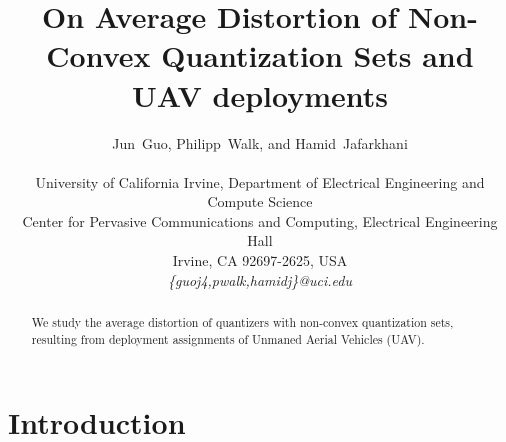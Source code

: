 \documentclass[smallabstract,smallcaptions]{dccpaper}
\begin{document}
%
\title{On Average Distortion of Non-Convex Quantization Sets and UAV deployments}


\newtheorem{corollary}{Corollary}

\author{Jun~Guo, Philipp~Walk, and Hamid~Jafarkhani\\
  {\small\hspace{-0.5cm}\begin{minipage}{\textwidth}
\begin{tabular}{c}
University of California Irvine, Department of Electrical Engineering and Compute Science\\
Center for Pervasive Communications and Computing, Electrical Engineering Hall  \\
Irvine, CA 92697-2625, USA \\
{\it\{guoj4,pwalk,hamidj\}@uci.edu}
\end{tabular}
\end{minipage}}
}

\maketitle
\begin{abstract}
  We study the average distortion of quantizers with non-convex quantization sets, resulting from deployment assignments
  of Unmaned Aerial Vehicles (UAV). 
\end{abstract}
%
\section{Introduction}
\end{document}
